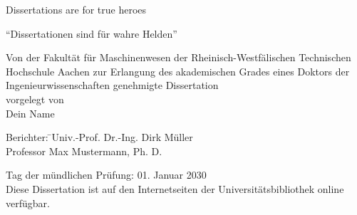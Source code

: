 \thispagestyle{empty}
\cleardoublepage\textbf{}

\begin{titlepage}

\vspace*{-3cm}

\vspace{3cm}

\begin{center}\large{Dissertations are for true heroes}\end{center}

\vspace{0.8 cm}

\begin{center}{``Dissertationen sind für wahre Helden''}\end{center}


\vspace{0.8cm} %

\begin{center}\small{\textsf{Von der Fakultät für Maschinenwesen der Rheinisch-Westfälischen Technischen Hochschule Aachen zur Erlangung des akademischen Grades eines Doktors der Ingenieurwissenschaften genehmigte Dissertation}}\\
\vspace{0.5cm}
\small{vorgelegt von} \\
\vspace{0.5cm}
\small{Dein Name}\end{center}%

\vspace{1.0cm}
\begin{tabbing}
\small{\textsf{Berichter:}} \= \small{\textsf{Univ.-Prof. Dr.-Ing. Dirk Müller}}\\
\>\small{\textsf{Professor Max Mustermann, Ph. D.}}\\ 
\end{tabbing}

\small{\textsf{Tag der mündlichen Prüfung: 01. Januar 2030}}\\

\vspace{0.5cm}
\small{\textsf{Diese Dissertation ist auf den Internetseiten der Universitätsbibliothek online verfügbar.}}


\end{titlepage}

